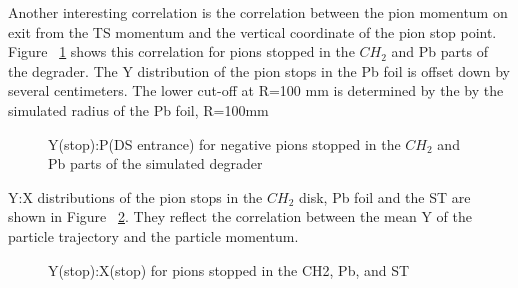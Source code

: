 Another interesting correlation is the correlation between the pion momentum on exit from the TS momentum
and the vertical coordinate of the pion stop point. Figure ~\ref{figure:y_vs_p_deg} shows this correlation
for pions stopped in the $CH_2$ and Pb parts of the degrader. The Y distribution of the pion stops
in the Pb foil is offset down by several centimeters. The lower cut-off at R=100 mm is determined by the
by the simulated radius of the Pb foil, R=100mm

\begin{figure}[H]
  \caption{
    \label{figure:y_vs_p_deg}
    Y(stop):P\@(DS entrance) for negative pions stopped in the $CH_2$ and Pb parts of the simulated degrader
  }
\end{figure}

Y:X distributions of the pion stops in the $CH_2$ disk, Pb foil and the ST are shown in Figure ~\ref{figure:y_vs_x_st}.
They reflect the correlation between the mean Y of the particle trajectory and the particle momentum.

\begin{figure}[H]
  \caption{
    \label{figure:y_vs_x_st}
    Y(stop):X(stop) for pions stopped in the CH2, Pb, and ST
  }
\end{figure}


